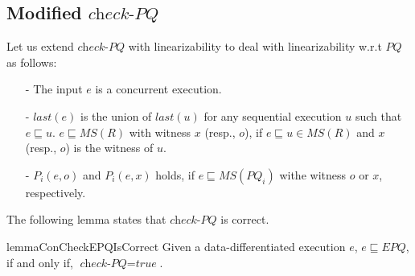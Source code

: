\subsection{Modified $\textit{check-PQ}$}
\label{subsec:recursive procedure con-check-EPQ}

Let us extend $\textit{check-PQ}$ with linearizability to deal with linearizability w.r.t $\textit{PQ}$ as follows: 

\begin{itemize}
\setlength{\itemsep}{0.5pt}
\item[-] The input $e$ is a concurrent execution. 

\item[-] $\textit{last}(e)$ is the union of $\textit{last}(u)$ for any sequential execution $u$ such that $e \sqsubseteq u$. $e \sqsubseteq \textit{MS}(R)$ with witness $x$ (resp., $o$), if $e \sqsubseteq u \in \textit{MS}(R)$ and $x$ (resp., $o$) is the witness of $u$. 
    
\item[-] $P_i(e,o)$ and $P_i(e,x)$ holds, if $e \sqsubseteq \textit{MS}(\textit{PQ}_i)$ withe witness $o$ or $x$, respectively. 
\end{itemize} 

The following lemma states that $\textit{check-PQ}$ is correct. 

\begin{restatable}{lemma}{ConCheckEPQIsCorrect}
\label{lemma:con-check-EPQ is correct}
Given a data-differentiated execution $e$, $e \sqsubseteq \textit{EPQ}$, if and only if, $\textit{check-PQ} = \textit{true}$.
\end{restatable} 

